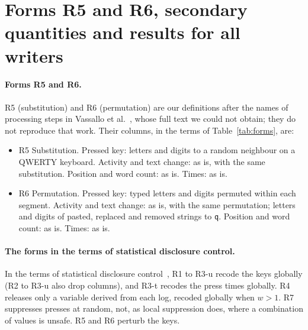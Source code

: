\section{Forms R5 and R6, secondary quantities and results for all writers}
\label{app:results}


\paragraph{Forms R5 and R6.}
R5 (substitution) and R6 (permutation) are our definitions after the names of processing steps in Vassallo et
al.~\cite{vassallo2017privacy}, whose full text we could not obtain; they do not reproduce that work. Their columns,
in the terms of Table~\ref{tab:forms}, are:
\begin{itemize}
  \item R5 Substitution. Pressed key: letters and digits to a random neighbour on a QWERTY keyboard. Activity and text
    change: as is, with the same substitution. Position and word count: as is. Times: as is.
  \item R6 Permutation. Pressed key: typed letters and digits permuted within each segment. Activity and text change:
    as is, with the same permutation; letters and digits of pasted, replaced and removed strings to \texttt{q}.
    Position and word count: as is. Times: as is.
\end{itemize}

\paragraph{The forms in the terms of statistical disclosure control.}
In the terms of statistical disclosure control~\cite{hundepool2026handbook}, R1 to R3-u recode the keys globally (R2 to
R3-u also drop columns), and R3-t recodes the press times globally. R4 releases only a variable derived from each log,
recoded globally when $w > 1$. R7 suppresses presses at random, not, as local suppression does, where a combination of
values is unsafe. R5 and R6 perturb the keys.

